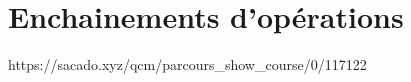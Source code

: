 

% 
% 


% 




\chapter{Enchainements d'opérations}
{https://sacado.xyz/qcm/parcours_show_course/0/117122}

